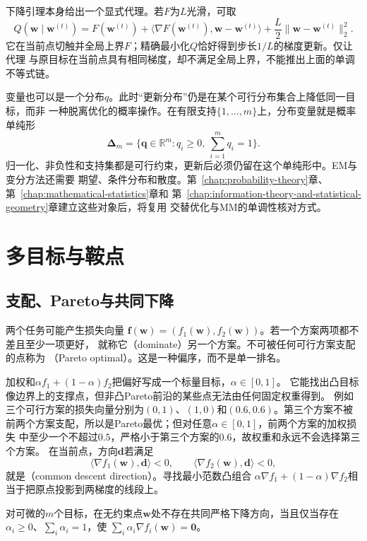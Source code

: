 下降引理本身给出一个显式代理。若$F$为$L$光滑，可取
\[
  Q(\bm{w}\mid\bm{w}^{(t)})
  =F(\bm{w}^{(t)})
  +\langle\nabla F(\bm{w}^{(t)}),\bm{w}-\bm{w}^{(t)}\rangle
  +\frac{L}{2}\lVert\bm{w}-\bm{w}^{(t)}\rVert_2^2.
\]
它在当前点切触并全局上界$F$；精确最小化$Q$恰好得到步长$1/L$的梯度更新。仅让代理
与原目标在当前点具有相同梯度，却不满足全局上界，不能推出上面的单调不等式链。

变量也可以是一个分布$q$。此时“更新分布”仍是在某个可行分布集合上降低同一目标，而非
一种脱离优化的概率操作。在有限支持$\{1,\ldots,m\}$上，分布变量就是概率单纯形
\[
  \bm{\Delta}_m
  =\{\bm{q}\in\mathbb{R}^m:q_i\geq0,\ \sum_{i=1}^m q_i=1\}.
\]
归一化、非负性和支持集都是可行约束，更新后必须仍留在这个单纯形中。EM与变分方法还需要
期望、条件分布和散度。第~\ref{chap:probability-theory}章、
第~\ref{chap:mathematical-statistics}章和
第~\ref{chap:information-theory-and-statistical-geometry}章建立这些对象后，将复用
交替优化与MM的单调性核对方式。

\section{多目标与鞍点}
\label{sec:opt-multiobjective-saddle}

\subsection{支配、Pareto与共同下降}

两个任务可能产生损失向量
$\bm{f}(\bm{w})=(f_1(\bm{w}),f_2(\bm{w}))$。若一个方案两项都不差且至少一项更好，
就称它（dominate）另一个方案。不可被任何可行方案支配的点称为
（Pareto optimal）。这是一种偏序，而不是单一排名。

加权和$\alpha f_1+(1-\alpha)f_2$把偏好写成一个标量目标，$\alpha\in[0,1]$。
它能找出凸目标像边界上的支撑点，但非凸Pareto前沿的某些点无法由任何固定权重得到。
例如三个可行方案的损失向量分别为$(0,1)$、$(1,0)$和$(0.6,0.6)$。第三个方案不被
前两个方案支配，所以是Pareto最优；但对任意$\alpha\in[0,1]$，前两个方案的加权损失
中至少一个不超过$0.5$，严格小于第三个方案的$0.6$，故权重和永远不会选择第三个方案。
在当前点，方向$\bm{d}$若满足
\[
  \langle\nabla f_1(\bm{w}),\bm{d}\rangle<0,\qquad
  \langle\nabla f_2(\bm{w}),\bm{d}\rangle<0,
\]
就是（common descent direction）。寻找最小范数凸组合
$\alpha\nabla f_1+(1-\alpha)\nabla f_2$相当于把原点投影到两梯度的线段上。

\begin{theorem}[无共同下降方向的一阶判定]
\label{thm:opt-common-descent}
对可微的$m$个目标，在无约束点$\bm{w}$处不存在共同严格下降方向，当且仅当存在
$\alpha_i\geq0$、$\sum_i\alpha_i=1$，使
$\sum_i\alpha_i\nabla f_i(\bm{w})=\bm{0}$。
\end{theorem}

